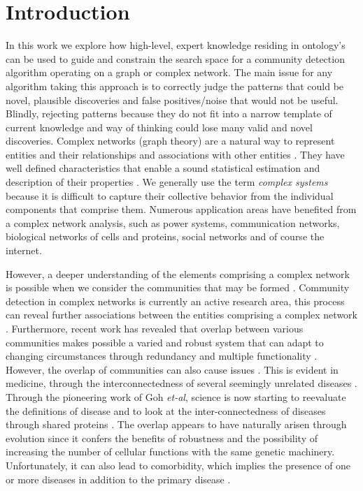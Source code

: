 \documentclass[a4paper,8pt,twocolumn,5p]{elsarticle}
\begin{document}
\section{Introduction}
In this work we explore how high-level, expert knowledge residing in ontology's can be used to guide and constrain the search space for a community detection algorithm operating on a graph or complex network.  The main issue for any algorithm taking this approach is to correctly judge the patterns that could be novel, plausible discoveries and false positives/noise that would not be useful. Blindly, rejecting patterns because they do not fit into a narrow template of current knowledge and way of thinking could lose many valid and novel discoveries. Complex networks (graph theory) are a natural way to represent entities and their relationships and associations with other entities \cite{Erdos1959,Albert2002}. They have well defined characteristics that enable a sound statistical estimation and description of their properties \cite{Milo02,Yaveroglu2014}. We generally use the term {\it complex systems} because it is difficult to capture their collective behavior from the individual components that comprise them. Numerous application areas have benefited from a complex network analysis, such as power systems, communication networks, biological networks of cells and proteins, social networks and of course the internet.

However, a deeper understanding of the elements comprising a complex network is possible when we consider the communities that may be formed \cite{Girvan2002,Ahn2010}. Community detection in complex networks is currently an active research area, this process can reveal further associations between the entities comprising a complex network \cite{Palla2005,Kim2013}.  Furthermore, recent work has revealed that overlap between various communities makes possible a varied and robust system that can adapt to changing circumstances through redundancy and  multiple functionality \cite{Barabasi2011,Ravasz2002}. However, the overlap of communities can also cause issues \cite{Granovetter1973}. This is evident in medicine, through the interconnectedness of several seemingly unrelated diseases \cite{Menche2015}. Through the pioneering work of  Goh {\it et-al},  science is now starting to reevaluate the definitions of disease and to look at the inter-connectedness of diseases through shared proteins \citep{Goh2007}. The overlap appears to have naturally arisen through evolution since it confers the benefits of robustness and the possibility of increasing the number of cellular functions with the same genetic machinery.  Unfortunately, it can also lead to comorbidity, which implies the presence of one or more diseases in addition to the primary disease \cite{Halban06}.
\end{document}
